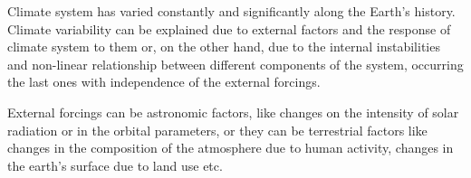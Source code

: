 Climate system has varied constantly and significantly along the Earth's history. Climate variability can be explained due to external factors and the response of climate system to them or, on the other hand, due to the internal instabilities and non-linear relationship between different components of the system, occurring the last ones with independence of the external forcings.


External forcings can be astronomic factors, like changes on the intensity of solar radiation or in the orbital parameters, or they can be terrestrial factors like changes in the composition of the atmosphere due to human activity, changes in the earth's surface due to land use etc.




